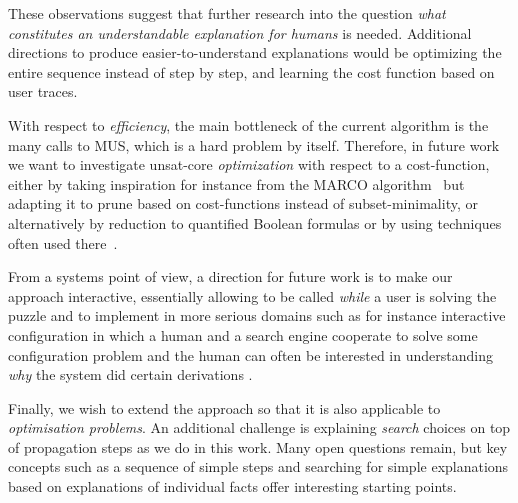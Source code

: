 These observations suggest that further research into the question \emph{what constitutes an understandable explanation for humans} is needed. Additional directions to produce easier-to-understand explanations would be optimizing the entire sequence instead of step by step, and learning the cost function based on user traces.

With respect to \emph{efficiency}, the main bottleneck of the current algorithm is the many calls to MUS, which is a hard problem by itself. 
Therefore, in future work we want to investigate unsat-core \emph{optimization} with respect to a cost-function, either by taking inspiration for instance from the MARCO algorithm~\cite{liffiton2013enumerating} but adapting it to prune based on cost-functions instead of subset-minimality, or alternatively by reduction to quantified Boolean formulas or by using techniques often used there~\cite{QBF,DBLP:journals/constraints/IgnatievJM16}.

From a systems point of view, a direction for future work is to make our approach interactive, essentially allowing \ourtool to be called \emph{while} a user is solving the puzzle and to implement in more serious domains such as for instance interactive configuration in which a human and a search engine cooperate to solve some configuration problem and the human can often be interested in understanding \emph{why} the system did certain derivations \cite{DBLP:journals/tplp/HertumDJD17,DBLP:conf/bnaic/CarbonnelleADVD19}. 

Finally, we wish to extend the approach so that it is also applicable to \textit{optimisation problems}. An additional challenge is explaining \textit{search} choices on top of propagation steps as we do in this work. Many open questions remain, but key concepts such as a sequence of simple steps and searching for simple explanations based on explanations of individual facts offer interesting starting points.
